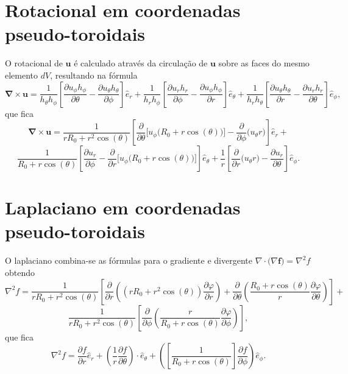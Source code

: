 \documentclass[12pt,oneside,a4paper]{abntex2}
\begin{document}
\section{Rotacional em coordenadas pseudo-toroidais}
\noindent O rotacional de $\bm{u}$ é calculado através da circulação de $\bm{u}$ sobre as faces do mesmo elemento $dV$, resultando na fórmula
\begin{equation}
\bm{\nabla} \times \bm{u} = \frac{1}{h_\theta h_\phi} \left[ \dfrac{\partial u_\phi  h_\phi}{\partial \theta} - \dfrac{\partial u_\theta  h_\theta}{\partial \phi} \right] \hat{e}_r+\frac{1}{h_r h_\phi} \left[ \dfrac{\partial u_r  h_r}{\partial \phi} - \dfrac{\partial u_\phi  h_\phi}{\partial r} \right] \hat{e}_\theta+\frac{1}{h_r h_\theta} \left[ \dfrac{\partial u_\theta  h_\theta}{\partial r} - \dfrac{\partial u_r  h_r}{\partial \theta}  \right] \hat{e}_\phi,
\end{equation}
que fica
\begin{equation}
\bm{\nabla} \times \bm{u} = \frac{1}{r R_0 + r^2 \cos(\theta)} \left[ \dfrac{\partial }{\partial \theta} \Big[ u_\phi \big(R_0 + r \cos(\theta)\big)\Big] - \dfrac{\partial }{\partial \phi} \big( u_\theta r \big) \right] \hat{e}_r+
\end{equation}
\begin{equation*}
\frac{1}{R_0 + r \cos(\theta)} \left[ \dfrac{\partial u_r}{\partial \phi} - \dfrac{\partial }{\partial r} \Big[ u_\phi  \big( R_0 + r \cos(\theta) \big) \Big] \right] \hat{e}_\theta+\frac{1}{r} \left[ \dfrac{\partial }{\partial r}\big( u_\theta  r\big) - \dfrac{\partial u_r}{\partial \theta}  \right] \hat{e}_\phi.
\end{equation*}
\section{Laplaciano em coordenadas pseudo-toroidais}
\noindent  O laplaciano combina-se as fórmulas para o gradiente e divergente $\nabla \cdot \big( \nabla\bm{f} \big) = \nabla^2 f$ obtendo
\begin{equation}
\nabla^2 f = \frac{1}{r R_0 + r^2 \cos(\theta)}  \left[  \dfrac{\partial}{\partial r} \left( (r R_0 + r^2 \cos(\theta))\dfrac{\partial \varphi}{\partial r} \right)+\dfrac{\partial}{\partial \theta} \left( \frac{R_0 + r\cos(\theta)}{r}\dfrac{\partial \varphi}{\partial \theta} \right)\right]+
\end{equation}
\begin{equation*}
\frac{1}{r R_0 + r^2 \cos(\theta)}  \left[ \dfrac{\partial}{\partial \phi} \left( \frac{r}{R_0 + r\cos(\theta)}\dfrac{\partial \varphi}{\partial \phi} \right)  \right],
\end{equation*}
que fica
\begin{equation}
\nabla^2 f = \dfrac{\partial f}{\partial r}  \hat{e}_r + \left(\frac{1}{r}\dfrac{\partial f}{\partial \theta} \right) \cdot \hat{e}_\theta + \left( \left[ \frac{1}{ R_0 + r \cos(\theta)}\right] \dfrac{\partial f}{\partial \phi}\right)  \hat{e}_\phi.
\end{equation}
\end{document}
